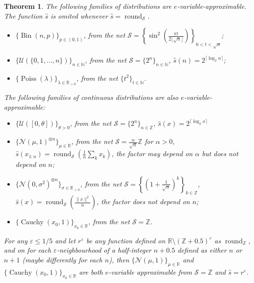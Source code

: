 \documentclass{article}
\newtheorem{theorem}{Theorem}
\theoremstyle{definition}
\theoremstyle{definition}
\newcommand{\intnums}{\mathbb{Z}}
\newcommand{\reals}{\mathbb{R}}
\newcommand{\Cauchy}{\operatorname{Cauchy}}
\begin{document}
\begin{theorem}\label{thm:most-e-var-results}
    The following families of distributions are $e$-variable-approximable. The function $\hat{s}$ is omited whenever $\hat{s}=\operatorname{round}_{\mathcal{S}}$.
    \begin{itemize}
        \item $\{\operatorname{Bin}(n,p)\}_{p\in(0,1)}$, from the net $\mathcal{S}=\left\{ \sin^2\left(\frac{\pi t}{2\lfloor \sqrt{n}\rfloor}\right)\right\}_{0<t<\sqrt{n}}$;

        \item $\{\mathcal{U}(\{0,1,\ldots,n\})\}_{n\in\mathbb{N}}$, from the net $\mathcal{S}=\{2^n\}_{n\in\mathbb{N}}$, $\hat s(n)=2^{\lceil \log_2 n \rceil}$;

        \item $\{\operatorname{Poiss}(\lambda)\}_{\lambda\in\mathbb{R}_{>0}}$, from the net $\{t^2\}_{t\in\mathbb{N}}$.
    \end{itemize}

    The following families of continuous distributions are also $e$-variable-approximable:
    \begin{itemize}
        \item $\{\mathcal{U}([0,\theta])\}_{\theta > 0}$, from the net $\mathcal{S}=\{2^n\}_{n\in\intnums}$, $\hat s(x)=2^{\lceil \log_2 x \rceil}$
        \item $\{\mathcal{N}(\mu, 1)^{\otimes n}\}_{\mu\in\mathbb{R}}$, from the net $\mathcal{S}=\frac{\alpha}{\sqrt{n}}\mathbb{Z}$ for $\alpha > 0$, $\hat{s}(x_{1:n})=\operatorname{round}_\mathcal{S}\left(\frac{1}{n}\sum_k x_k\right)$, the factor may depend on $\alpha$ but does not depend on $n$;
        \item $\{\mathcal{N}(0, \sigma^2)^{\otimes n}\}_{\sigma\in\mathbb{R}_{>0}}$, from the net $\mathcal{S}=\left\{\left(1 + \frac{1}{\sqrt{n}}\right)^k\right\}_{k\in\mathbb{Z}}$, $\hat{s}(x)=\operatorname{round}_\mathcal{S}\left(\frac{\|x\|^2}{n}\right)$, the factor does not depend on $n$;
        \item $\{ \operatorname{Cauchy}(x_0,1)\}_{x_0 \in \reals}$, from the net $\mathcal{S}=\intnums$.
    \end{itemize}

    For any $\varepsilon \le 1/5$ and let $r^\varepsilon$ be any function defined on $\reals\setminus\left(\intnums+0.5\right)^\varepsilon$ as $\operatorname{round}_\intnums$, and on for each $\varepsilon$-neighbourhood of a half-integer $n+0.5$ defined as either $n$ or $n+1$ (maybe differently for each $n$), then $\{\mathcal{N}(\mu,1)\}_{\mu\in\reals}$ and $\{\Cauchy(x_0,1)\}_{x_0\in\reals}$ are both $e$-variable approximable from $\mathcal{S}=\intnums$ and $\hat{s}=r^\varepsilon$. 
\end{theorem}
\end{document}

